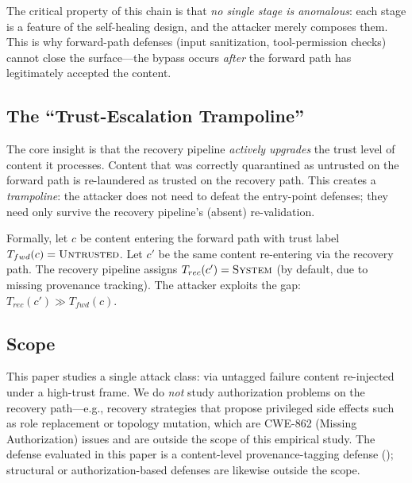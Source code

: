 The critical property of this chain is that \emph{no single stage is anomalous}: each stage is a feature of the self-healing design, and the attacker merely composes them. This is why forward-path defenses (input sanitization, tool-permission checks) cannot close the surface---the bypass occurs \emph{after} the forward path has legitimately accepted the content.

\subsection{The ``Trust-Escalation Trampoline''}

The core insight is that the recovery pipeline \emph{actively upgrades} the trust level of content it processes. Content that was correctly quarantined as untrusted on the forward path is re-laundered as trusted on the recovery path. This creates a \emph{trampoline}: the attacker does not need to defeat the entry-point defenses; they need only survive the recovery pipeline's (absent) re-validation.

Formally, let $c$ be content entering the forward path with trust label $T_{fwd}(c) = \textsc{Untrusted}$. Let $c'$ be the same content re-entering via the recovery path. The recovery pipeline assigns $T_{rec}(c') = \textsc{System}$ (by default, due to missing provenance tracking). The attacker exploits the gap: $T_{rec}(c') \gg T_{fwd}(c)$.

\subsection{Scope}
\label{sec:threat-scope}

This paper studies a single attack class: \rci{} via untagged failure content re-injected under a high-trust frame. We do \emph{not} study authorization problems on the recovery path---e.g., recovery strategies that propose privileged side effects such as role replacement or topology mutation, which are CWE-862 (Missing Authorization) issues and are outside the scope of this empirical study. The defense evaluated in this paper is a content-level provenance-tagging defense (\trustorigin{}); structural or authorization-based defenses are likewise outside the scope.
